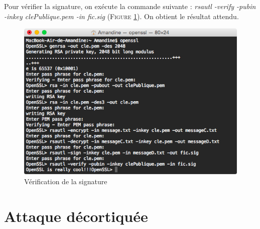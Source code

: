 \documentclass[11pt]{article}
\begin{document}
Pour vérifier la signature, on exécute la commande suivante : \textit{rsautl -verify -pubin -inkey clePublique.pem -in fic.sig} (\textsc{Figure \ref{fig:verification}}). On obtient le résultat attendu. 
    \begin{figure}[hbtp]
        \centering \includegraphics[scale=0.4]{Capture/question6c.png}
        \caption{Vérification de la signature}
         \label{fig:verification}
\end{figure}
\newpage
\section{Attaque décortiquée}
\end{document}
